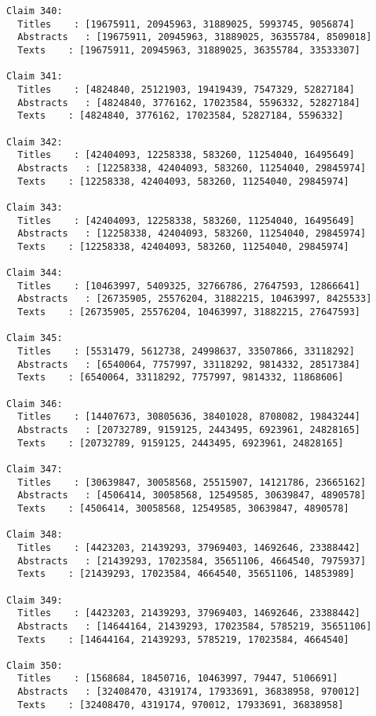 \documentclass[11pt]{article}
\begin{document}
\begin{Verbatim}[commandchars=\\\{\}]
Claim 340:
  Titles    : [19675911, 20945963, 31889025, 5993745, 9056874]
  Abstracts   : [19675911, 20945963, 31889025, 36355784, 8509018]
  Texts    : [19675911, 20945963, 31889025, 36355784, 33533307]

Claim 341:
  Titles    : [4824840, 25121903, 19419439, 7547329, 52827184]
  Abstracts   : [4824840, 3776162, 17023584, 5596332, 52827184]
  Texts    : [4824840, 3776162, 17023584, 52827184, 5596332]

Claim 342:
  Titles    : [42404093, 12258338, 583260, 11254040, 16495649]
  Abstracts   : [12258338, 42404093, 583260, 11254040, 29845974]
  Texts    : [12258338, 42404093, 583260, 11254040, 29845974]

Claim 343:
  Titles    : [42404093, 12258338, 583260, 11254040, 16495649]
  Abstracts   : [12258338, 42404093, 583260, 11254040, 29845974]
  Texts    : [12258338, 42404093, 583260, 11254040, 29845974]

Claim 344:
  Titles    : [10463997, 5409325, 32766786, 27647593, 12866641]
  Abstracts   : [26735905, 25576204, 31882215, 10463997, 8425533]
  Texts    : [26735905, 25576204, 10463997, 31882215, 27647593]

Claim 345:
  Titles    : [5531479, 5612738, 24998637, 33507866, 33118292]
  Abstracts   : [6540064, 7757997, 33118292, 9814332, 28517384]
  Texts    : [6540064, 33118292, 7757997, 9814332, 11868606]

Claim 346:
  Titles    : [14407673, 30805636, 38401028, 8708082, 19843244]
  Abstracts   : [20732789, 9159125, 2443495, 6923961, 24828165]
  Texts    : [20732789, 9159125, 2443495, 6923961, 24828165]

Claim 347:
  Titles    : [30639847, 30058568, 25515907, 14121786, 23665162]
  Abstracts   : [4506414, 30058568, 12549585, 30639847, 4890578]
  Texts    : [4506414, 30058568, 12549585, 30639847, 4890578]

Claim 348:
  Titles    : [4423203, 21439293, 37969403, 14692646, 23388442]
  Abstracts   : [21439293, 17023584, 35651106, 4664540, 7975937]
  Texts    : [21439293, 17023584, 4664540, 35651106, 14853989]

Claim 349:
  Titles    : [4423203, 21439293, 37969403, 14692646, 23388442]
  Abstracts   : [14644164, 21439293, 17023584, 5785219, 35651106]
  Texts    : [14644164, 21439293, 5785219, 17023584, 4664540]

Claim 350:
  Titles    : [1568684, 18450716, 10463997, 79447, 5106691]
  Abstracts   : [32408470, 4319174, 17933691, 36838958, 970012]
  Texts    : [32408470, 4319174, 970012, 17933691, 36838958]


\end{Verbatim}
\end{document}
